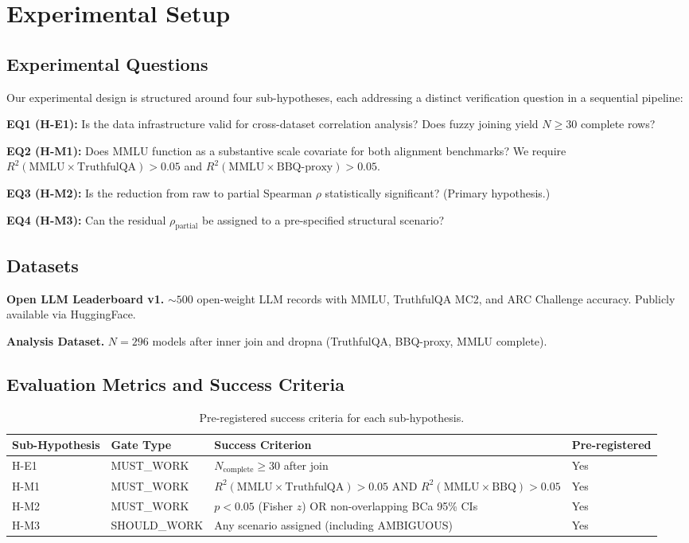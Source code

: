 \section{Experimental Setup}
\label{sec:experiments}

\subsection{Experimental Questions}

Our experimental design is structured around four sub-hypotheses, each addressing a distinct verification question in a sequential pipeline:

\textbf{EQ1 (H-E1):} Is the data infrastructure valid for cross-dataset correlation analysis? Does fuzzy joining yield $N \geq 30$ complete rows?

\textbf{EQ2 (H-M1):} Does MMLU function as a substantive scale covariate for both alignment benchmarks? We require $R^2(\text{MMLU} \times \text{TruthfulQA}) > 0.05$ and $R^2(\text{MMLU} \times \text{BBQ-proxy}) > 0.05$.

\textbf{EQ3 (H-M2):} Is the reduction from raw to partial Spearman $\rho$ statistically significant? (Primary hypothesis.)

\textbf{EQ4 (H-M3):} Can the residual $\rho_{\text{partial}}$ be assigned to a pre-specified structural scenario?

\subsection{Datasets}

\textbf{Open LLM Leaderboard v1.} ${\sim}500$ open-weight LLM records with MMLU, TruthfulQA MC2, and ARC Challenge accuracy. Publicly available via HuggingFace.

\textbf{Analysis Dataset.} $N{=}296$ models after inner join and dropna (TruthfulQA, BBQ-proxy, MMLU complete).

\subsection{Evaluation Metrics and Success Criteria}

\begin{table}[h]
\centering
\caption{Pre-registered success criteria for each sub-hypothesis.}
\label{tab:criteria}
\begin{tabular}{@{}llll@{}}
\toprule
Sub-Hypothesis & Gate Type & Success Criterion & Pre-registered \\
\midrule
H-E1 & MUST\_WORK & $N_{\text{complete}} \geq 30$ after join & Yes \\
H-M1 & MUST\_WORK & $R^2(\text{MMLU}{\times}\text{TruthfulQA}) > 0.05$ AND $R^2(\text{MMLU}{\times}\text{BBQ}) > 0.05$ & Yes \\
H-M2 & MUST\_WORK & $p < 0.05$ (Fisher $z$) OR non-overlapping BCa 95\% CIs & Yes \\
H-M3 & SHOULD\_WORK & Any scenario assigned (including AMBIGUOUS) & Yes \\
\bottomrule
\end{tabular}
\end{table}


